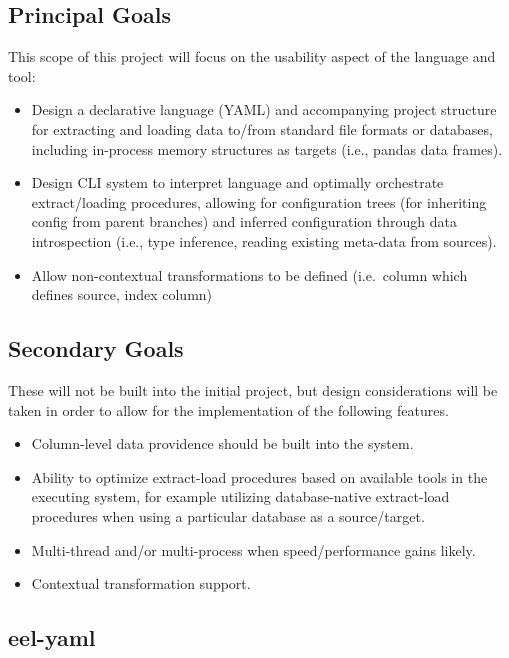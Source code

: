 

\subsection{Principal Goals}\label{principal-goals}

This scope of this project will focus on the usability aspect of the
language and tool:

\begin{itemize}
\item
  Design a declarative language (YAML) and accompanying project
  structure for extracting and loading data to/from standard file
  formats or databases, including in-process memory structures as
  targets (i.e., pandas data frames).
\item
  Design CLI system to interpret language and optimally orchestrate
  extract/loading procedures, allowing for configuration trees (for
  inheriting config from parent branches) and inferred configuration
  through data introspection (i.e., type inference, reading existing
  meta-data from sources).
\item
  Allow non-contextual transformations to be defined (i.e.~column which
  defines source, index column)
\end{itemize}

\subsection{Secondary Goals}\label{secondary-goals}

These will not be built into the initial project, but design
considerations will be taken in order to allow for the implementation of
the following features.

\begin{itemize}
\item
  Column-level data providence should be built into the system.
\item
  Ability to optimize extract-load procedures based on available tools
  in the executing system, for example utilizing database-native
  extract-load procedures when using a particular database as a
  source/target.
\item
  Multi-thread and/or multi-process when speed/performance gains likely.
\item
  Contextual transformation support.
\end{itemize}

\subsection{eel-yaml}\label{eel-yaml}

